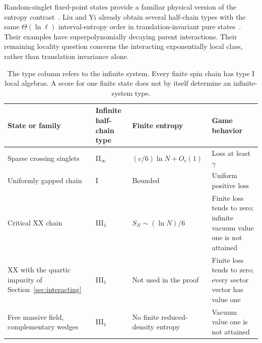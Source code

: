 Random-singlet fixed-point states provide a familiar physical version of
the entropy contrast~\cite{Fisher94,RefaelMoore04,Sierant26}.
Liu and Yi already obtain several half-chain types with the same
$\Theta(\ln\ell)$ interval-entropy order in translation-invariant pure
states~\cite{LiuYi26}. Their examples have superpolynomially decaying
parent interactions. Their remaining locality question concerns the
interacting exponentially local class, rather than translation invariance
alone.

\begin{table}[t]
\centering\small
\begin{tabular}{@{}>{\raggedright\arraybackslash}p{3.9cm}>{\raggedright\arraybackslash}p{2.5cm}>{\raggedright\arraybackslash}p{3.2cm}>{\raggedright\arraybackslash}p{4.8cm}@{}}
\toprule
State or family & Infinite half-chain type & Finite entropy & Game behavior\\
\midrule
Sparse crossing singlets & II$_\infty$ & $(c/6)\ln N+O_c(1)$ & Loss at least $\gamma$\\\addlinespace
Uniformly gapped chain & I & Bounded & Uniform positive loss\\\addlinespace
Critical XX chain & III$_1$ & $S_N\sim(\ln N)/6$ & Finite loss tends to zero; infinite vacuum value one is not attained\\\addlinespace
XX with the quartic impurity of Section~\ref{sec:interacting} & III$_1$ & Not used in the proof & Finite loss tends to zero; every sector vector has value one\\\addlinespace
Free massive field, complementary wedges & III$_1$ & No finite reduced-density entropy & Vacuum value one is not attained\\
\bottomrule
\end{tabular}
\caption{The type column refers to the infinite system. Every finite spin chain has type I local algebras. A score for one finite state does not by itself determine an infinite-system type.}\label{tab:reads}
\end{table}
